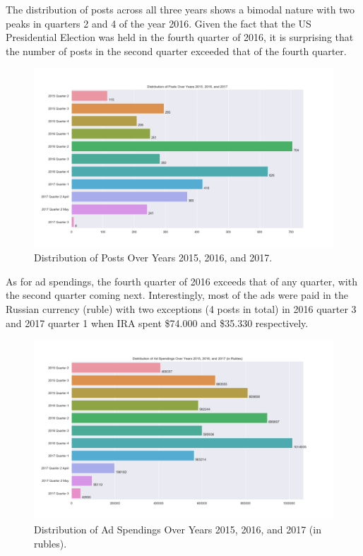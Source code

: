 \documentclass[12pt]{article}
\theoremstyle{definition}
\begin{document}
The distribution of posts across all three years shows a bimodal nature with
two peaks in quarters 2 and 4 of the year 2016. Given the fact that the US
Presidential Election was held in the fourth quarter of 2016, it is surprising
that the number of posts in the second quarter exceeded that of the fourth
quarter.

\begin{figure}[H]
\centering
\includegraphics[width=\columnwidth]{./image/barchart-plots/barchart_distribution_of_posts.png}
\caption{Distribution of Posts Over Years 2015, 2016, and 2017.}
\end{figure}

As for ad spendings, the fourth quarter of 2016 exceeds that of any quarter,
with the second quarter coming next. Interestingly, most of the ads were paid
in the Russian currency (ruble) with two exceptions (4 posts in total) in 2016
quarter 3 and 2017 quarter 1 when IRA spent \$74.000 and \$35.330 respectively.

\begin{figure}[H]
\centering
\includegraphics[width=\columnwidth]{./image/barchart-plots/barchart_ad_spend_RU_distribution.png}
\caption{Distribution of Ad Spendings Over Years 2015, 2016, and 2017 (in rubles).}
\end{figure}
\end{document}
